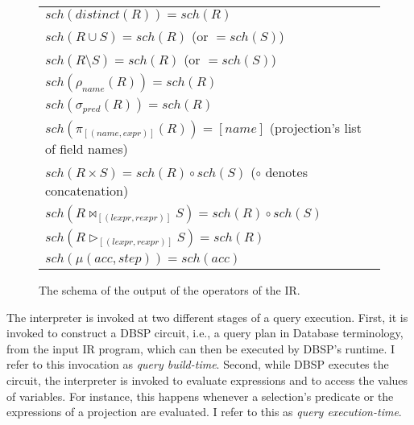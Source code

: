 \begin{figure}[htpb]
    \centering
    \begin{tabular}{@{}l@{}}
        \toprule
        \(\mathit{sch}(\mathit{distinct}(R)) = \mathit{sch}(R)\)                                                   \\
        \(\mathit{sch}(R \cup S) = \mathit{sch}(R)\) (or \(= \mathit{sch}(S)\))                                    \\
        \(\mathit{sch}(R \setminus S) = \mathit{sch}(R)\) (or \(= \mathit{sch}(S)\))                               \\
        \(\mathit{sch}(\rho_{\mathit{name}}(R)) = \mathit{sch}(R)\)                                                \\
        \(\mathit{sch}(\sigma_{\mathit{pred}}(R)) = \mathit{sch}(R)\)                                              \\
        \(\mathit{sch}(\pi_{[(\mathit{name},\mathit{expr})]}(R)) = [name]\) (projection's list of field names)     \\
        \(\mathit{sch}(R \times S) = \mathit{sch}(R) \circ \mathit{sch}(S)\) (\(\circ\) denotes concatenation)     \\
        \(\mathit{sch}(R \bowtie_{[(\mathit{lexpr}, \mathit{rexpr})]} S) = \mathit{sch}(R) \circ \mathit{sch}(S)\) \\
        \(\mathit{sch}(R \triangleright_{[(\mathit{lexpr}, \mathit{rexpr})]} S) = \mathit{sch}(R) \)               \\
        \(\mathit{sch}(\mu(\mathit{acc}, \mathit{step})) = \mathit{sch}(\mathit{acc})\)                            \\
        \bottomrule
    \end{tabular}
    \caption{The schema of the output of the operators of the \ac{IR}.}\label{tab:ir-schema-operators}
\end{figure}

The interpreter is invoked at two different stages of a query execution.
First, it is invoked to construct a DBSP circuit, i.e., a query plan in
Database terminology, from the input \ac{IR} program, which can then be
executed by DBSP's runtime. I refer to this invocation as \emph{query build-time}.
Second, while DBSP executes the circuit, the interpreter is invoked to
evaluate expressions and to access the values of variables. For instance,
this happens whenever a selection's predicate or the expressions of a projection
are evaluated. I refer to this as \emph{query execution-time}.


